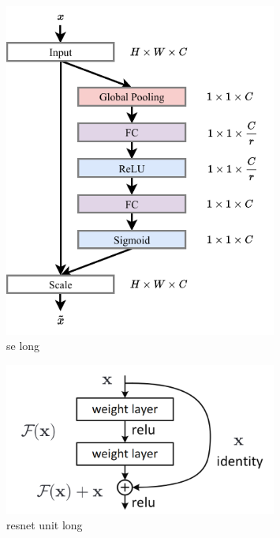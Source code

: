 \begin{figure} %
    \includegraphics[width=0.8\textwidth]{diagrams/6-cvn/se.pdf}
    \caption[se short]
    {se long}
    \label{fig:se}
\end{figure} %

\begin{figure} %
    \includegraphics[width=0.8\textwidth]{diagrams/6-cvn/resnet_unit.png}
    \caption[resnet unit short]
    {resnet unit long}
    \label{fig:resnet_unit}
\end{figure} %

